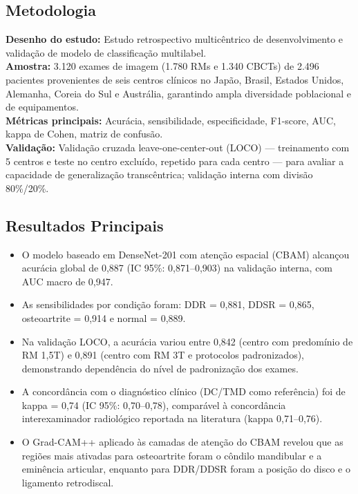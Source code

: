 \subsection{Metodologia}
\textbf{Desenho do estudo:} Estudo retrospectivo multicêntrico de
desenvolvimento e validação de modelo de classificação multilabel. \\
\textbf{Amostra:} 3.120 exames de imagem (1.780 RMs e 1.340 CBCTs) de
2.496 pacientes provenientes de seis centros clínicos no Japão, Brasil,
Estados Unidos, Alemanha, Coreia do Sul e Austrália, garantindo ampla
diversidade poblacional e de equipamentos. \\
\textbf{Métricas principais:} Acurácia, sensibilidade, especificidade,
F1-score, AUC, kappa de Cohen, matriz de confusão. \\
\textbf{Validação:} Validação cruzada leave-one-center-out (LOCO) —
treinamento com 5 centros e teste no centro excluído, repetido para
cada centro — para avaliar a capacidade de generalização transcêntrica;
validação interna com divisão 80\%/20\%.

\subsection{Resultados Principais}
\begin{itemize}
  \item O modelo baseado em DenseNet-201 com atenção espacial (CBAM)
        alcançou acurácia global de 0,887 (IC 95\%: 0,871--0,903) na
        validação interna, com AUC macro de 0,947.
  \item As sensibilidades por condição foram: DDR = 0,881, DDSR = 0,865,
        osteoartrite = 0,914 e normal = 0,889.
  \item Na validação LOCO, a acurácia variou entre 0,842 (centro com
        predomínio de RM 1,5T) e 0,891 (centro com RM 3T e protocolos
        padronizados), demonstrando dependência do nível de padronização
        dos exames.
  \item A concordância com o diagnóstico clínico (DC/TMD como referência)
        foi de kappa = 0,74 (IC 95\%: 0,70--0,78), comparável à
        concordância interexaminador radiológico reportada na literatura
        (kappa 0,71--0,76).
  \item O Grad-CAM++ aplicado às camadas de atenção do CBAM revelou que
        as regiões mais ativadas para osteoartrite foram o côndilo
        mandibular e a eminência articular, enquanto para DDR/DDSR foram
        a posição do disco e o ligamento retrodiscal.
\end{itemize}

